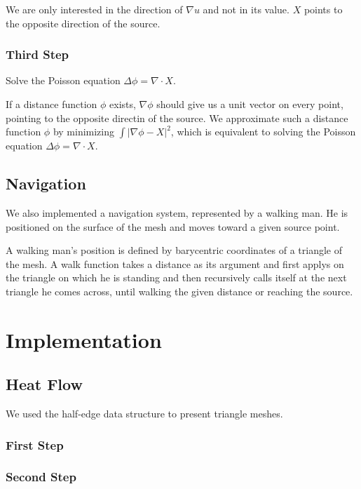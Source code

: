 \documentclass[a4paper,12pt,twoside]{article}
\begin{document}
We are only interested in the direction of $\nabla u$ and not in its value. $X$ points to the opposite direction of the source. 

\subsubsection{Third Step}

Solve the Poisson equation $\Delta \phi = \nabla \cdot X$.

If a distance function $\phi$ exists, $\nabla \phi$ should give us a unit vector on every point, pointing to the opposite directin of the source. We approximate such a distance function $\phi$ by minimizing $\int \left | \nabla \phi - X \right |^{2}$, which is equivalent to solving the Poisson equation $\Delta \phi = \nabla \cdot X$.

\subsection{Navigation}

We also implemented a navigation system, represented by a walking man. He is positioned on the surface of the mesh and moves toward a given source point. 

A walking man's position is defined by barycentric coordinates of a triangle of the mesh. A walk function takes a distance as its argument and first applys on the triangle on which he is standing and then recursively calls itself at the next triangle he comes across, until walking the given distance or reaching the source.

\section{Implementation}

\subsection{Heat Flow}

We used the half-edge data structure to present triangle meshes.

\subsubsection{First Step}

\subsubsection{Second Step}
\end{document}
